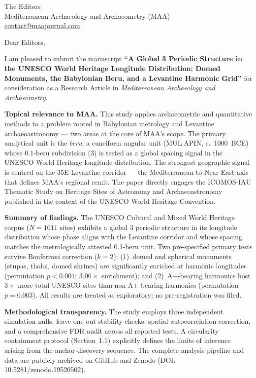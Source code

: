 \documentclass[12pt,a4paper]{letter}
\begin{document}
\begin{letter}{The Editors\\
Mediterranean Archaeology and Archaeometry (MAA)\\
\href{mailto:contact@maajournal.com}{contact@maajournal.com}}

\opening{Dear Editors,}

I am pleased to submit the manuscript \textbf{``A Global 3\textdegree{}
Periodic Structure in the UNESCO World Heritage Longitude Distribution:
Domed Monuments, the Babylonian Beru, and a Levantine Harmonic Grid''} for
consideration as a Research Article in \textit{Mediterranean Archaeology
and Archaeometry}.

\textbf{Topical relevance to MAA.}
This study applies archaeometric and quantitative methods to a problem rooted
in Babylonian metrology and Levantine archaeoastronomy --- two areas at the
core of MAA's scope. The primary analytical unit is the \textit{beru}, a
cuneiform angular unit (MUL.APIN, c.~1000~BCE) whose 0.1-beru subdivision
(3\textdegree{}) is tested as a global spacing signal in the UNESCO World
Heritage longitude distribution. The strongest geographic signal is centred
on the 35\textdegree{}E Levantine corridor --- the Mediterranean-to-Near
East axis that defines MAA's regional remit. The paper directly engages the
ICOMOS-IAU Thematic Study on Heritage Sites of Astronomy and Archaeoastronomy
published in the context of the UNESCO World Heritage Convention.

\textbf{Summary of findings.}
The UNESCO Cultural and Mixed World Heritage corpus ($N = 1011$ sites)
exhibits a global 3\textdegree{} periodic structure in its longitude
distribution whose phase aligns with the Levantine corridor and whose
spacing matches the metrologically attested 0.1-beru unit. Two
pre-specified primary tests survive Bonferroni correction ($k = 2$):
(1)~domed and spherical monuments (stupas, tholoi, domed shrines) are
significantly enriched at harmonic longitudes (permutation $p < 0.001$;
$3.06\times$ enrichment); and (2)~A+-bearing harmonics host $3\times$ more
total UNESCO sites than non-A+-bearing harmonics (permutation $p = 0.003$).
All results are treated as exploratory; no pre-registration was filed.

\textbf{Methodological transparency.}
The study employs three independent simulation nulls, leave-one-out
stability checks, spatial-autocorrelation correction, and a comprehensive
FDR audit across all reported tests. A circularity containment protocol
(Section~1.1) explicitly defines the limits of inference arising from the
anchor-discovery sequence. The complete analysis pipeline and data are
publicly archived on GitHub and Zenodo (DOI: 10.5281/zenodo.19520502).


\end{letter}
\end{document}
